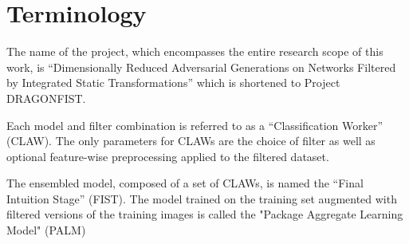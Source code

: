 \section{Terminology} \label{s:terminology}
The name of the project, which encompasses the entire research scope of this work, is ``Dimensionally Reduced Adversarial Generations on Networks Filtered by Integrated Static Transformations'' which is shortened to Project DRAGONFIST.

Each model and filter combination is referred to as a ``Classification Worker'' (CLAW). The only parameters for CLAWs are the choice of filter as well as optional feature-wise preprocessing applied to the filtered dataset.

The ensembled model, composed of a set of CLAWs, is named the ``Final Intuition Stage'' (FIST). The model trained on the training set augmented with filtered versions of the training images is called the "Package Aggregate Learning Model" (PALM)
